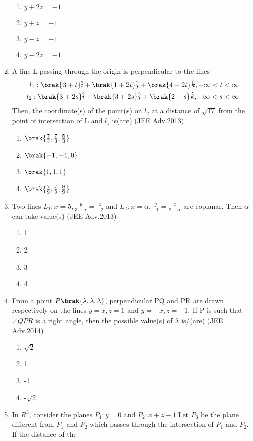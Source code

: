 \begin{enumerate}
		\begin{enumerate}
			\item $y+2z=-1$
			\item $y+z=-1$
			\item $y-z=-1$
			\item $y-2z=-1$
		\end{enumerate}
	\item A line L passing through the origin is perpendicular to the lines
		\begin{align*}
			l_1 : \brak{3+t}\hat{i}+\brak{1+2t}\hat{j}+\brak{4+2t}\hat{k}, -\infty<t<\infty \\
			l_2 : \brak{3+2s}\hat{i}+\brak{3+2s}\hat{j}+\brak{2+s}\hat{k},-\infty<s<\infty 
		\end{align*}
		Then, the coordinate(s) of the point(s) on $l_2$ at a distance of $\sqrt{17}$ from the point of intersection of L and $l_1$ is(are) \hfill{(JEE Adv.2013)}
		\begin{enumerate}
			\item $\brak{\frac{7}{3},\frac{7}{3},\frac{5}{3}}$
			\item $\brak{-1,-1,0}$
			\item $\brak{1,1,1}$
			\item $\brak{\frac{7}{9},\frac{7}{9},\frac{8}{9}}$
		\end{enumerate}
	\item Two lines $L_1: x=5,\frac{y}{3-\alpha}=\frac{z}{-2}$ and $L_2: x=\alpha,\frac{y}{-1}=\frac{z}{2-\alpha}$ are coplanar. Then $\alpha$ can take value(s) \hfill{(JEE Adv.2013)}
		\begin{enumerate}
			\item 1
			\item 2 
			\item 3
			\item 4
		\end{enumerate}
	\item From a point $P\brak{\lambda,\lambda,\lambda}$, perpendicular PQ and PR are drawn respectively on the lines $y=x,z=1$ and $y=-x,z=-1$. If P is such that $\angle QPR$ is a right angle, then
		the possible value(s) of $\lambda$ is/(are) \hfill{(JEE Adv.2014)}
		\begin{enumerate}
			\item $\sqrt{2}$
			\item 1 
			\item -1 
			\item -$\sqrt{2}$
		\end{enumerate}
	\item In $R^3$, consider the planes $P_1:y=0$ and $P_2:x+z-1$.Let $P_3$ be the plane different from $P_1$ and $P_2$ which passes through the intersection of $P_1$ and $P_2$. If the distance of the

\end{enumerate}
